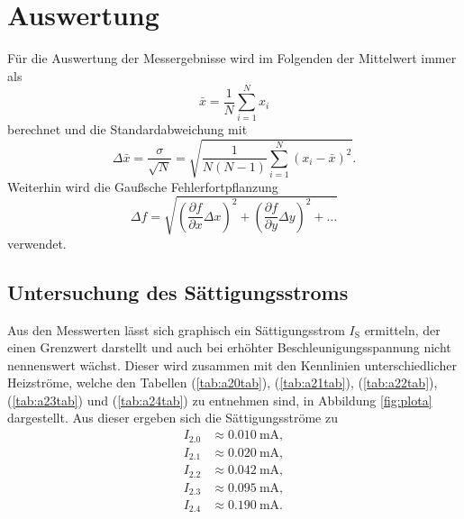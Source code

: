 \section{Auswertung}
\label{sec:Auswertung}

Für die Auswertung der Messergebnisse wird im Folgenden der Mittelwert immer als
\begin{equation*}
  \bar{x} = \frac{1}{N}\sum_{i=1}^{N} x_{i}
\end{equation*}
berechnet und die Standardabweichung mit
\begin{equation*}
  \Delta\bar{x} = \frac{\sigma}{\sqrt{N}} = \sqrt{\frac{1}{N(N-1)}\sum_{i=1}^{N} (x_{i} - \bar{x})^2}.
\end{equation*}
Weiterhin wird die Gaußsche Fehlerfortpflanzung
\begin{equation*}
  \Delta f = \sqrt{\left(\frac{\partial f}{\partial x}\Delta x\right)^2 + \left(\frac{\partial f}{\partial y}\Delta y\right)^2 + \dots}
\end{equation*}
verwendet.

\subsection{Untersuchung des Sättigungsstroms}
Aus den Messwerten lässt sich graphisch ein Sättigungsstrom $I_\text{S}$ ermitteln, der einen
Grenzwert darstellt und auch bei erhöhter Beschleunigungsspannung nicht nennenswert wächst.
Dieser wird zusammen mit den Kennlinien unterschiedlicher Heizströme, welche den Tabellen
(\ref{tab:a20tab}), (\ref{tab:a21tab}), (\ref{tab:a22tab}), (\ref{tab:a23tab}) und (\ref{tab:a24tab}) zu entnehmen sind, 
in Abbildung \ref{fig:plota} dargestellt.
Aus dieser ergeben sich die Sättigungsströme zu
\begin{align*}
  I_\text{2.0} &\approx \SI{0.010}{\milli\ampere}, \\
  I_\text{2.1} &\approx \SI{0.020}{\milli\ampere}, \\
  I_\text{2.2} &\approx \SI{0.042}{\milli\ampere}, \\
  I_\text{2.3} &\approx \SI{0.095}{\milli\ampere}, \\
  I_\text{2.4} &\approx \SI{0.190}{\milli\ampere}.
\end{align*}

